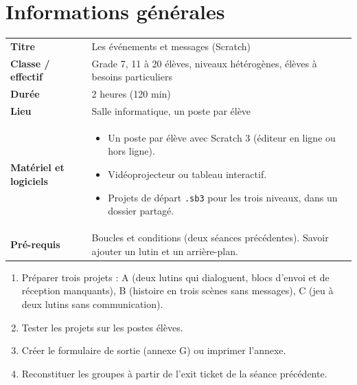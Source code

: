 \documentclass[11pt,a4paper]{article}
\begin{document}

\section{Informations générales}
\begin{tabularx}{\linewidth}{>{\bfseries}p{3.6cm}Y}
\toprule
Titre & Les événements et messages (Scratch)\\
Classe / effectif & Grade 7, 11 à 20 élèves, niveaux hétérogènes, élèves à besoins particuliers\\
Durée & 2 heures (120 min)\\
Lieu & Salle informatique, un poste par élève\\
Matériel et logiciels &
\begin{itemize}
 \item Un poste par élève avec Scratch 3 (éditeur en ligne ou hors ligne).
 \item Vidéoprojecteur ou tableau interactif.
 \item Projets de départ \texttt{.sb3} pour les trois niveaux, dans un dossier partagé.
\end{itemize}\\
Pré-requis &
Boucles et conditions (deux séances précédentes). Savoir ajouter un lutin et un arrière-plan.\\
\bottomrule
\end{tabularx}

\begin{astuce}
\begin{enumerate}
 \item Préparer trois projets : A (deux lutins qui dialoguent, blocs d'envoi et de réception manquants), B (histoire en trois scènes sans messages), C (jeu à deux lutins sans communication).
 \item Tester les projets sur les postes élèves.
 \item Créer le formulaire de sortie (annexe G) ou imprimer l'annexe.
 \item Reconstituer les groupes à partir de l'exit ticket de la séance précédente.
\end{enumerate}
\end{astuce}

\end{document}
